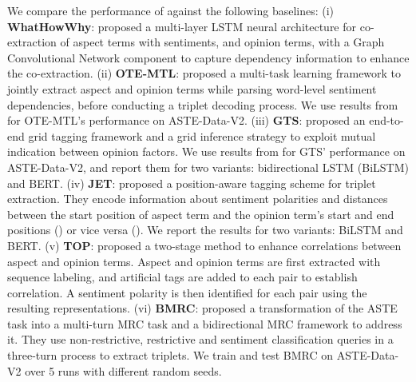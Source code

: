 \documentclass[sigconf]{acmart}
\begin{document}
\begin{table}[ht!]
We compare the performance of \mymodel{} against the following baselines: (i) \textbf{WhatHowWhy}: \citet{peng2020knowing} proposed a multi-layer LSTM neural architecture for co-extraction of aspect terms with sentiments, and opinion terms, with a Graph Convolutional Network \cite{kipf2016semi} component to capture dependency information to enhance the co-extraction. (ii) \textbf{OTE-MTL}: \citet{zhang2020multi} proposed a multi-task learning framework to jointly extract aspect and opinion terms while parsing word-level sentiment dependencies, before conducting a triplet decoding process. We use results from \citet{huang2021first} for OTE-MTL's performance on ASTE-Data-V2. (iii) \textbf{GTS}: \citet{wu2020grid} proposed an end-to-end grid tagging framework and a grid inference strategy to exploit mutual indication between opinion factors. We use results from \citet{huang2021first} for GTS' performance on ASTE-Data-V2, and report them for two variants: bidirectional LSTM (BiLSTM) and BERT. (iv) \textbf{JET}: \citet{xu2020position} proposed a position-aware tagging scheme for triplet extraction. They encode information about sentiment polarities and distances between the start position of aspect term and the opinion term's start and end positions () or vice versa (). We report the results for two variants: BiLSTM and BERT. (v) \textbf{TOP}: \citet{huang2021first} proposed a two-stage method to enhance correlations between aspect and opinion terms. Aspect and opinion terms are first extracted with sequence labeling, and artificial tags are added to each pair to establish correlation. A sentiment polarity is then identified for each pair using the resulting representations. (vi) \textbf{BMRC}: \citet{chen2021bidirectional} proposed a transformation of the ASTE task into a multi-turn MRC task and a bidirectional MRC framework to address it. They use non-restrictive, restrictive and sentiment classification queries in a three-turn process to extract triplets. We train and test BMRC on ASTE-Data-V2 over 5 runs with different random seeds.








\end{table}
\end{document}
